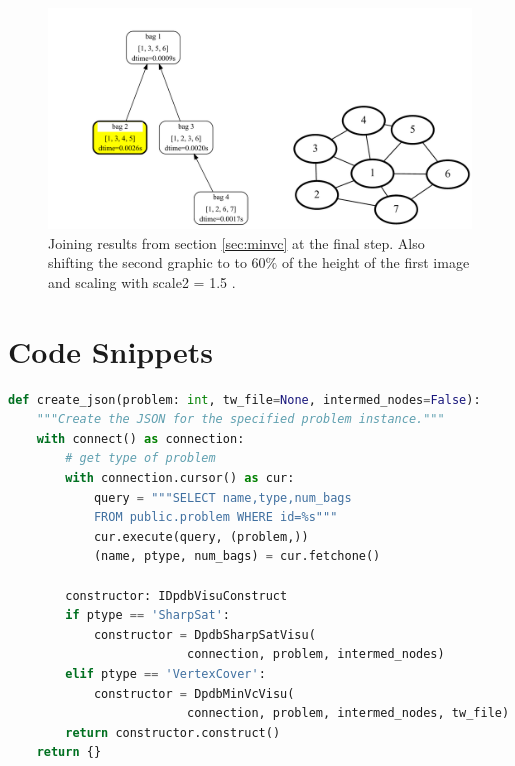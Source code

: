 \documentclass[a4paper, 12pt, bibliography=totoc]{scrartcl}
\begin{document}
\begin{figure}
	\centering
	\includegraphics[width=0.9\linewidth,height=0.9\textheight,keepaspectratio]{images/SVGJOIN/default_06sc15_rise1.pdf}
	\caption{Joining results from section \ref{sec:minvc} at the final step. Also shifting the second graphic to to $60\%$ of the height of the first image and scaling with scale2 = 1.5 .}
	\label{fig:joinscaledrise5}
\end{figure}

\newpage
\section{Code Snippets}



\begin{lstlisting}[language={Python}, caption={Construct\_dpdb\_visu.py}, label={lst:create-json}]
def create_json(problem: int, tw_file=None, intermed_nodes=False):
	"""Create the JSON for the specified problem instance."""
	with connect() as connection:
		# get type of problem
		with connection.cursor() as cur:
			query = """SELECT name,type,num_bags 
			FROM public.problem WHERE id=%s"""
			cur.execute(query, (problem,))
			(name, ptype, num_bags) = cur.fetchone()
		
		constructor: IDpdbVisuConstruct  
		if ptype == 'SharpSat':
			constructor = DpdbSharpSatVisu(
						 connection, problem, intermed_nodes)
		elif ptype == 'VertexCover':
			constructor = DpdbMinVcVisu(
						 connection, problem, intermed_nodes, tw_file)
		return constructor.construct()
	return {} 
\end{lstlisting}
\end{document}
